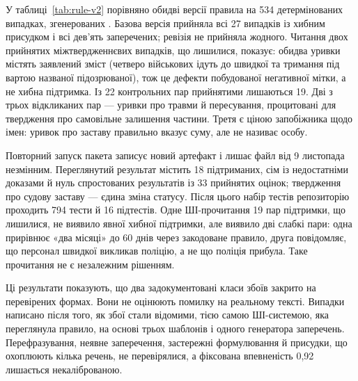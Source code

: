 У таблиці~\ref{tab:rule-v2} порівняно обидві версії правила на 534 детермінованих випадках, згенерованих . Базова версія прийняла всі 27 випадків із хибним присудком і всі дев'ять заперечених; ревізія не прийняла жодного. Читання двох прийнятих міжтвердженнєвих випадків, що лишилися, показує: обидва уривки містять заявлений зміст (четверо військових ідуть до швидкої та тримання під вартою названої підозрюваної), тож це дефекти побудованої негативної мітки, а не хибна підтримка. Із 22 контрольних пар прийнятими лишаються 19. Дві з трьох відкликаних пар --- уривки про травми й пересування, процитовані для твердження про самовільне залишення частини. Третя є ціною запобіжника щодо імен: уривок про заставу правильно вказує суму, але не називає особу.

Повторний запуск пакета записує новий артефакт і лишає файл від 9 листопада незмінним. Переглянутий результат містить 18 підтриманих, сім із недостатніми доказами й нуль спростованих результатів із 33 прийнятих оцінок; твердження про судову заставу --- єдина зміна статусу. Після цього набір тестів репозиторію проходить 794 тести й 16 підтестів. Одне ШІ-прочитання 19 пар підтримки, що лишилися, не виявило явної хибної підтримки, але виявило дві слабкі пари: одна прирівнює «два місяці» до 60 днів через закодоване правило, друга повідомляє, що персонал швидкої викликав поліцію, а не що поліція прибула. Таке прочитання не є незалежним рішенням.

Ці результати показують, що два задокументовані класи збоїв закрито на перевірених формах. Вони не оцінюють помилку на реальному тексті. Випадки написано після того, як збої стали відомими, тією самою ШІ-системою, яка переглянула правило, на основі трьох шаблонів і одного генератора заперечень. Перефразування, неявне заперечення, застережні формулювання й присудки, що охоплюють кілька речень, не перевірялися, а фіксована впевненість 0,92 лишається некаліброваною.
